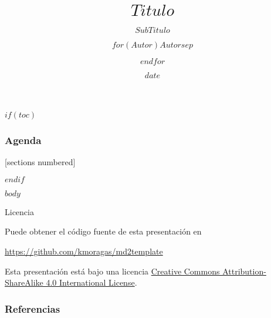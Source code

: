 \documentclass[10pt]{beamer}
\title{$Titulo$}
\subtitle{$SubTitulo$}
\author{$for(Autor)$$Autor$$sep$ \and $endfor$}
\date{$date$}
\institute{$Instituto$}
\begin{document}
\maketitle

$if(toc)$

\begin{frame}
  \frametitle{Agenda}
  [sections numbered]
  \tableofcontents[hideallsubsections]
\end{frame}

$endif$


$body$



\begin{frame}{Licencia}

  Puede obtener el código fuente de esta presentación en

  \begin{center}\url{https://github.com/kmoragas/md2template}\end{center}

  Esta presentación está bajo una licencia 
  \href{http://creativecommons.org/licenses/by-sa/4.0/}{Creative Commons
  Attribution-ShareAlike 4.0 International License}.

  \begin{center}\ccbysa\end{center}

\end{frame}

\begin{frame}[allowframebreaks]

  \frametitle{Referencias}

  
  

\end{frame}
\end{document}

